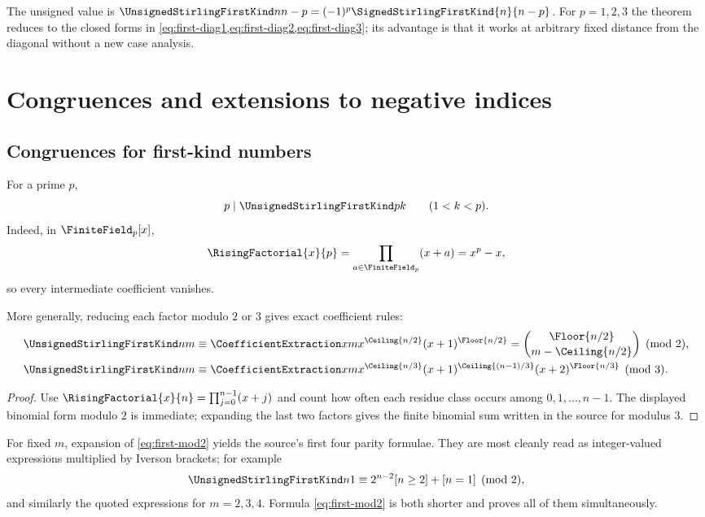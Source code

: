 \documentclass[11pt,a4paper,oneside,openany]{book}
\theoremstyle{definition}
\theoremstyle{remark}
\begin{document}
The unsigned value is
$\UnsignedStirlingFirstKind n{n-p}=(-1)^p \SignedStirlingFirstKind{n}{n-p}$.  For $p=1,2,3$ the theorem reduces to the
closed forms in \cref{eq:first-diag1,eq:first-diag2,eq:first-diag3}; its advantage is that it works
at arbitrary fixed distance from the diagonal without a new case analysis.
\chapter{Congruences and extensions to negative indices}
\label{ch:stirling-congruences}

\section{Congruences for first-kind numbers}
For a prime $p$,
\begin{equation}\label{eq:prime-first-divisibility}
 p\mid\UnsignedStirlingFirstKind pk\qquad(1<k<p).
\end{equation}
Indeed, in $\FiniteField_p[x]$,
\[
 \RisingFactorial{x}{p}=\prod_{a\in\FiniteField_p}(x+a)=x^p-x,
\]
so every intermediate coefficient vanishes.

More generally, reducing each factor modulo $2$ or $3$ gives exact coefficient rules:
\begin{align}
 \UnsignedStirlingFirstKind nm
 &\equiv \CoefficientExtraction xm x^{\Ceiling{n/2}}(x+1)^{\Floor{n/2}}
  =\binom{\Floor{n/2}}{m-\Ceiling{n/2}}\pmod2,
 \label{eq:first-mod2}\\
 \UnsignedStirlingFirstKind nm
 &\equiv \CoefficientExtraction xm
 x^{\Ceiling{n/3}}(x+1)^{\Ceiling{(n-1)/3}}(x+2)^{\Floor{n/3}}
 \pmod3.\label{eq:first-mod3}
\end{align}
\begin{proof}
Use $\RisingFactorial{x}{n}=\prod_{j=0}^{n-1}(x+j)$ and count how often each residue class
occurs among $0,1,\ldots,n-1$.  The displayed binomial form modulo $2$ is immediate;
expanding the last two factors gives the finite binomial sum written in the source
for modulus $3$.
\end{proof}

For fixed $m$, expansion of \cref{eq:first-mod2} yields the source's first four
parity formulae.  They are most cleanly read as integer-valued expressions multiplied
by Iverson brackets; for example
\[
 \UnsignedStirlingFirstKind n1\equiv 2^{n-2}[n\ge2]+[n=1]\pmod2,
\]
and similarly the quoted expressions for $m=2,3,4$.  Formula
\cref{eq:first-mod2} is both shorter and proves all of them simultaneously.
\end{document}
